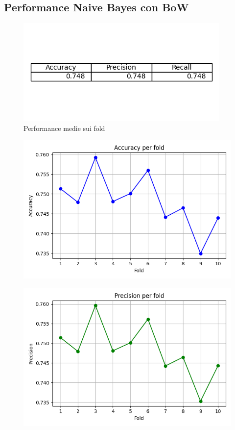 \documentclass[12pt,a4paper]{report} %
\begin{document}
\subsection{Performance Naive Bayes con BoW}
\begin{figure}[H]
    \centering
    \includegraphics[width=0.75\linewidth]{immagini_modeling/nb_bow.png}
    \caption{Performance medie sui fold}
    \label{fig:enter-label}
\end{figure}
\begin{figure}[H]
    \centering
    \includegraphics[width=0.75\linewidth]{immagini_modeling/accuracy_nb.png}
    \label{fig:enter-label}
\end{figure}
\begin{figure}[H]
    \centering
    \includegraphics[width=0.75\linewidth]{immagini_modeling/precision_nb.png}
   
    \label{fig:enter-label}
\end{figure}
\end{document}
